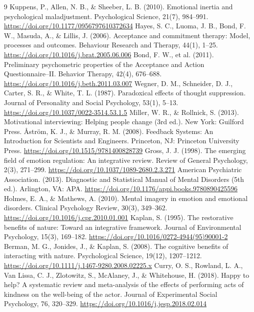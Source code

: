 \documentclass[10pt]{article}
\theoremstyle{remark}
\begin{document}
\begin{thebibliography}{9}
 Kuppens, P., Allen, N. B., \& Sheeber, L. B. (2010). Emotional inertia and psychological maladjustment. Psychological Science, 21(7), 984--991. \url{https://doi.org/10.1177/0956797610372634}
 Hayes, S. C., Luoma, J. B., Bond, F. W., Masuda, A., \& Lillis, J. (2006). Acceptance and commitment therapy: Model, processes and outcomes. Behaviour Research and Therapy, 44(1), 1--25. \url{https://doi.org/10.1016/j.brat.2005.06.006}
 Bond, F. W., et al. (2011). Preliminary psychometric properties of the Acceptance and Action Questionnaire--II. Behavior Therapy, 42(4), 676--688. \url{https://doi.org/10.1016/j.beth.2011.03.007}
 Wegner, D. M., Schneider, D. J., Carter, S. R., \& White, T. L. (1987). Paradoxical effects of thought suppression. Journal of Personality and Social Psychology, 53(1), 5--13. \url{https://doi.org/10.1037/0022-3514.53.1.5}
 Miller, W. R., \& Rollnick, S. (2013). Motivational interviewing: Helping people change (3rd ed.). New York: Guilford Press.
 \AA{}ström, K. J., \& Murray, R. M. (2008). Feedback Systems: An Introduction for Scientists and Engineers. Princeton, NJ: Princeton University Press. \url{https://doi.org/10.1515/9781400828739}
 Gross, J. J. (1998). The emerging field of emotion regulation: An integrative review. Review of General Psychology, 2(3), 271--299. \url{https://doi.org/10.1037/1089-2680.2.3.271}
 American Psychiatric Association. (2013). Diagnostic and Statistical Manual of Mental Disorders (5th ed.). Arlington, VA: APA. \url{https://doi.org/10.1176/appi.books.9780890425596}
 Holmes, E. A., \& Mathews, A. (2010). Mental imagery in emotion and emotional disorders. Clinical Psychology Review, 30(3), 349--362. \url{https://doi.org/10.1016/j.cpr.2010.01.001}
 Kaplan, S. (1995). The restorative benefits of nature: Toward an integrative framework. Journal of Environmental Psychology, 15(3), 169--182. \url{https://doi.org/10.1016/0272-4944(95)90001-2}
 Berman, M. G., Jonides, J., \& Kaplan, S. (2008). The cognitive benefits of interacting with nature. Psychological Science, 19(12), 1207--1212. \url{https://doi.org/10.1111/j.1467-9280.2008.02225.x}
 Curry, O. S., Rowland, L. A., Van Lissa, C. J., Zlotowitz, S., McAlaney, J., \& Whitehouse, H. (2018). Happy to help? A systematic review and meta-analysis of the effects of performing acts of kindness on the well-being of the actor. Journal of Experimental Social Psychology, 76, 320--329. \url{https://doi.org/10.1016/j.jesp.2018.02.014}

\end{thebibliography}
\end{document}

